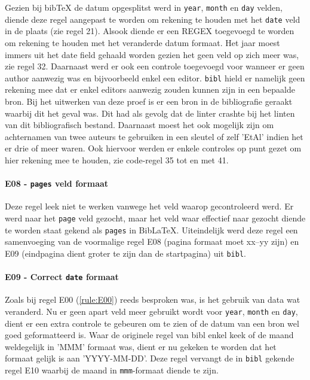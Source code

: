 Gezien bij bibTeX de datum opgesplitst werd in \texttt{year}, \texttt{month} en \texttt{day} velden, diende deze regel aangepast te worden om rekening te houden met het \texttt{date} veld in de plaats (zie regel 21). Alsook diende er een \acrfull{REGEX} toegevoegd te worden om rekening te houden met het veranderde datum formaat. Het jaar moest immers uit het date field gehaald worden gezien het geen veld op zich meer was, zie regel 32. Daarnaast werd er ook een controle toegevoegd voor wanneer er geen author aanwezig was en bijvoorbeeld enkel een editor. \texttt{bibl} hield er namelijk geen rekening mee dat er enkel editors aanwezig zouden kunnen zijn in een bepaalde bron. Bij het uitwerken van deze proef is er een bron in de bibliografie geraakt waarbij dit het geval was. Dit had als gevolg dat de linter crashte bij het linten van dit bibliografisch bestand.
Daarnaast moest het ook mogelijk zijn om achternamen van twee auteurs te gebruiken in een sleutel of zelf 'EtAl' indien het er drie of meer waren. Ook hiervoor werden er enkele controles op punt gezet om hier rekening mee te houden, zie code-regel 35 tot en met 41.

\paragraph{E08 - \texttt{pages} veld formaat}
Deze regel leek niet te werken vanwege het veld waarop gecontroleerd werd. Er werd naar het \texttt{page} veld gezocht, maar het veld waar effectief naar gezocht diende te worden staat gekend als \texttt{pages} in BibLaTeX. Uiteindelijk werd deze regel een samenvoeging van de voormalige regel E08 (pagina formaat moet xx--yy zijn) en E09 (eindpagina dient groter te zijn dan de startpagina) uit \texttt{bibl}.

\paragraph{E09 - Correct \texttt{date} formaat}
Zoals bij regel E00 (\ref{rule:E00}) reeds besproken was, is het gebruik van data wat veranderd. Nu er geen apart veld meer gebruikt wordt voor \texttt{year}, \texttt{month} en \texttt{day}, dient er een extra controle te gebeuren om te zien of de datum van een bron wel goed geformatteerd is. Waar de originele regel van bibl enkel keek of de maand weldegelijk in 'MMM' formaat was, dient er nu gekeken te worden dat het formaat gelijk is aan 'YYYY-MM-DD'. Deze regel vervangt de in \texttt{bibl} gekende regel E10 waarbij de maand in \texttt{mmm}-formaat diende te zijn.

